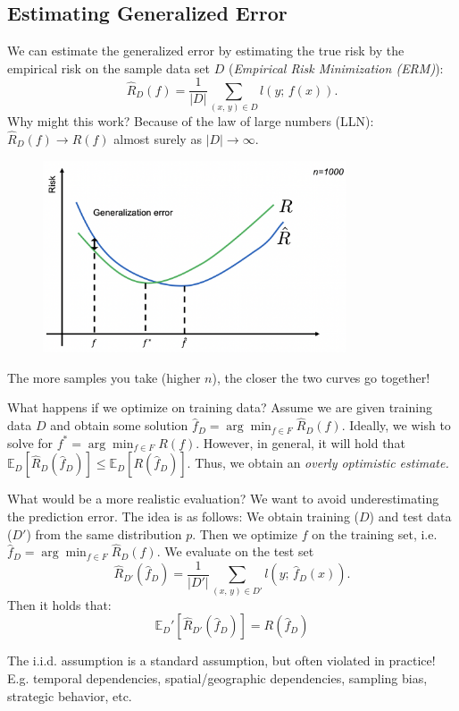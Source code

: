 \documentclass[a4paper]{extarticle}
\begin{document}
\subsection{Estimating Generalized Error}

We can estimate the generalized error by estimating the true risk by the empirical risk on the sample data set $D$ (\textit{Empirical Risk Minimization (ERM)}):
\[
    \hat{R}_D(f) = \frac{1}{|D|}\sum_{(x, \, y) \in D} l(y; \, f(x)).
\]
Why might this work? Because of the law of large numbers (LLN): $\hat{R}_D(f) \to R(f)$ almost surely as $|D| \to \infty$.

\begin{figure}[H]
    \includegraphics[width=9cm]{../images/IntroML_Fig10-1}
    \centering
\end{figure}

The more samples you take (higher $n$), the closer the two curves go together!

What happens if we optimize on training data? Assume we are given training data $D$ and obtain some solution $\hat{f}_D = \arg \min_{f \in F} \hat{R}_D(f)$. Ideally, we wish to solve for $f^* = \arg \min_{f \in F}R(f)$. However, in general, it will hold that $\mathbb{E}_D[\hat{R}_D(\hat{f}_D)] \leq \mathbb{E}_D[R(\hat{f}_D)]$. Thus, we obtain an \textit{overly optimistic estimate.}

What would be a more realistic evaluation? We want to avoid underestimating the prediction error. The idea is as follows: We obtain training ($D$) and test data ($D'$) from the same distribution $p$. Then we optimize $f$ on the training set, i.e. $\hat{f}_D = \arg \min_{f \in F} \hat{R}_D(f)$. We evaluate on the test set
\[
    \hat{R}_{D'}(\hat{f}_D) = \frac{1}{|D'|}\sum_{(x, \, y) \in D'}l(y; \, \hat{f}_D(x)).
\]
Then it holds that:
\[
    \mathbb{E}_D'[\hat{R}_{D'}(\hat{f}_D)] = R(\hat{f}_D)
\]

The i.i.d. assumption is a standard assumption, but often violated in practice! E.g. temporal dependencies, spatial/geographic dependencies, sampling bias, strategic behavior, etc.
\end{document}

